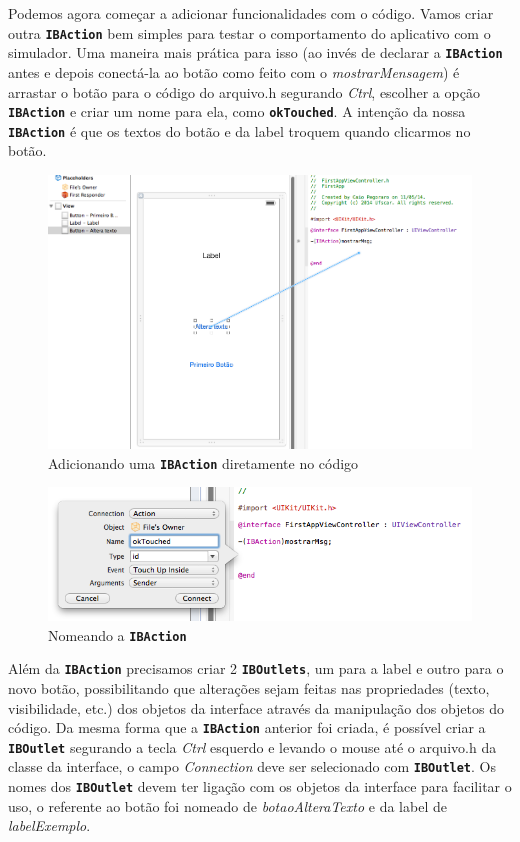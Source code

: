 \documentclass[a4paper,12pt,brazil,oneside]{book}
\begin{document}
Podemos agora começar a adicionar funcionalidades com o código. Vamos criar outra \texttt{\textbf{IBAction}} bem simples para testar o comportamento do aplicativo com o simulador. Uma maneira mais prática para isso (ao invés de declarar a \texttt{\textbf{IBAction}} antes e depois conectá-la ao botão como feito com o \emph{mostrarMensagem}) é arrastar o botão para o código do arquivo.h segurando \emph{Ctrl}, escolher a opção \texttt{\textbf{IBAction}} e criar um nome para ela, como \texttt{\textbf{okTouched}}. A intenção da nossa \texttt{\textbf{IBAction}} é que os textos do botão e da label troquem quando clicarmos no botão.

\begin{figure}[H]
  \centering
  \includegraphics[width=.99\textwidth]{figuras/3/tela_novo_projeto_27.png}
  \caption{Adicionando uma \texttt{\textbf{IBAction}} diretamente no código}
  \label{fig:a}
\end{figure}

\begin{figure}[H]
  \centering
  \includegraphics[width=.75\textwidth]{figuras/3/tela_novo_projeto_28.png}
  \caption{Nomeando a \texttt{\textbf{IBAction}}}
  \label{fig:a}
\end{figure}


Além da \texttt{\textbf{IBAction}} precisamos criar 2 \texttt{\textbf{IBOutlets}}, um para a label e outro para o novo botão, possibilitando que alterações sejam feitas nas propriedades (texto, visibilidade, etc.) dos objetos da interface através da manipulação dos objetos do código.
Da mesma forma que a \texttt{\textbf{IBAction}} anterior foi criada, é possível criar a \texttt{\textbf{IBOutlet}} segurando a tecla \emph{Ctrl} esquerdo e levando o mouse até o arquivo.h da classe da interface, o campo \emph{Connection} deve ser selecionado com \texttt{\textbf{IBOutlet}}.
Os nomes dos  \texttt{\textbf{IBOutlet}} devem ter ligação com os objetos da interface para facilitar o uso, o referente ao botão foi nomeado de \emph{botaoAlteraTexto} e da label de \emph{labelExemplo}.
\end{document}

